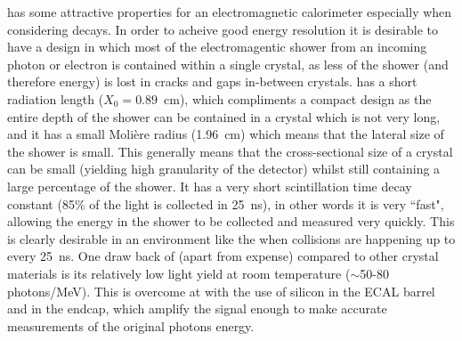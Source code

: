 \PbWO has some attractive properties for an electromagnetic calorimeter especially when considering \Hgg decays. In order to acheive good energy resolution it is desirable to have a design in which most of the electromagentic shower from an incoming photon or electron is contained within a single crystal, as less of the shower (and therefore energy) is lost in cracks and gaps in-between crystals. \PbWO has a short radiation length ($X_{0}=0.89$~cm), which compliments a compact design as the entire depth of the shower can be contained in a crystal which is not very long, and it has a small Moli\`{e}re radius (1.96~cm) which means that the lateral size of the shower is small. This generally means that the cross-sectional size of a crystal can be small (yielding high granularity of the detector) whilst still containing a large percentage of the shower. It has a very short scintillation time decay constant (85\% of the light is collected in 25~ns), in other words it is very ``fast", allowing the energy in the shower to be collected and measured very quickly. This is clearly desirable in an environment like the \LHC when collisions are happening up to every 25~ns. One draw back of \PbWO (apart from expense) compared to other crystal materials is its relatively low light yield at room temperature ($\sim$50-80 photons/MeV). This is overcome at \CMS with the use of silicon \APDs in the ECAL barrel and \VPTs in the endcap, which amplify the signal enough to make accurate measurements of the original photons energy. 
